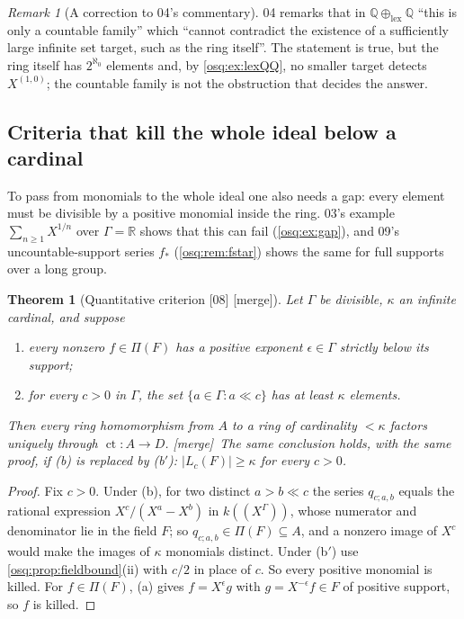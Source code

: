 \documentclass[11pt,letterpaper]{article}
\numberwithin{equation}{section}
\newtheorem{theorem}{Theorem}[section]
\theoremstyle{definition}
\theoremstyle{remark}
\newtheorem{remark}[remark]{Remark}
\theoremstyle{plain}
\newcommand{\Q}{\mathbb Q}
\newcommand{\R}{\mathbb R}
\newcommand{\hahn}[2]{#1(\!(X^{#2})\!)}
\newcommand{\ct}{\operatorname{ct}}
\newcommand{\src}[1]{\textup{\textsf{[#1]}}}
\newcommand{\merge}{\textup{\textsf{[merge]}}}
\begin{document}
\begin{remark}[A correction to 04's commentary]\label{osq:rem:04misleading}
04 remarks that in $\Q\oplus_{\mathrm{lex}}\Q$ ``this is only a countable family'' which
``cannot contradict the existence of a sufficiently large infinite set target, such as the
ring itself''. The statement is true, but the ring itself has $2^{\aleph_0}$ elements and,
by \cref{osq:ex:lexQQ}, no smaller target detects $X^{(1,0)}$; the countable family is not the
obstruction that decides the answer.
\end{remark}

\subsection{Criteria that kill the whole ideal below a cardinal}\label{osq:sub:criteria}

To pass from monomials to the whole ideal one also needs a gap: every element must be
divisible by a positive monomial inside the ring. 03's example $\sum_{n\ge1}X^{1/n}$ over
$\Gamma=\R$ shows that this can fail (\cref{osq:ex:gap}), and 09's uncountable-support series
$f_*$ (\cref{osq:rem:fstar}) shows the same for full supports over a long group.

\begin{theorem}[Quantitative criterion \src{08} \merge]\label{osq:thm:criterion}
Let $\Gamma$ be divisible, $\kappa$ an infinite cardinal, and suppose
\begin{enumerate}
\item[(a)] every nonzero $f\in\Pi(F)$ has a positive exponent $\epsilon\in\Gamma$ strictly
below its support;
\item[(b)] for every $c>0$ in $\Gamma$, the set $\{a\in\Gamma:a\ll c\}$ has at least $\kappa$
elements.
\end{enumerate}
Then every ring homomorphism from $A$ to a ring of cardinality $<\kappa$ factors uniquely
through $\ct:A\to D$. \merge\ The same conclusion holds, with the same proof, if (b) is replaced
by (b$'$): $|L_c(F)|\ge\kappa$ for every $c>0$.
\end{theorem}
\begin{proof}
Fix $c>0$. Under (b), for two distinct $a>b\ll c$ the series $q_{c;a,b}$ equals the rational
expression $X^c/(X^a-X^b)$ in $\hahn k\Gamma$, whose numerator and denominator lie in the field
$F$; so $q_{c;a,b}\in\Pi(F)\subseteq A$, and a nonzero image of $X^c$ would make the images of
$\kappa$ monomials distinct. Under (b$'$) use \cref{osq:prop:fieldbound}(ii) with $c/2$ in
place of $c$. So every positive monomial is killed. For $f\in\Pi(F)$, (a) gives
$f=X^\epsilon g$ with $g=X^{-\epsilon}f\in F$ of positive support, so $f$ is killed.
\end{proof}
\end{document}
